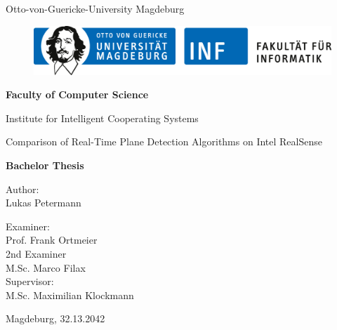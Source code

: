 \documentclass[main.tex]{subfiles}
\begin{document}
\thispagestyle {empty}

\begin{center}
\begin{Large}
Otto-von-Guericke-University Magdeburg\\

\begin{figure}
	\centering
	\includegraphics[width=15 cm]{images/fin_logo.jpg}
	\label{fig:logoinffak}
\end{figure}

\vspace{3mm}

\textbf{Faculty of Computer Science}\\
\end{Large}

\vspace{3mm}

Institute for Intelligent Cooperating Systems \\

\vspace{1cm}
\begin{Huge}
Comparison of Real-Time Plane Detection Algorithms on Intel RealSense\\
\end{Huge}
\vspace{10mm}
{\Huge \textbf{Bachelor Thesis}}\\
\vspace{8mm}

Author:\\
\vspace{4mm}
{\huge Lukas Petermann}\\

\vspace{8mm}

Examiner:\\
\vspace{2mm}
{\Large Prof. Frank Ortmeier}\\
\vspace{4mm}
2nd Examiner\\
\vspace{2mm}
{\Large M.Sc. Marco Filax}\\
\vspace{8mm}
Supervisor:\\
\vspace{2mm}
{\large M.Sc. Maximilian Klockmann}\\

\vspace{\fill}

{\large Magdeburg, 32.13.2042}\\


\end{center}
\clearpage
\end{document}
